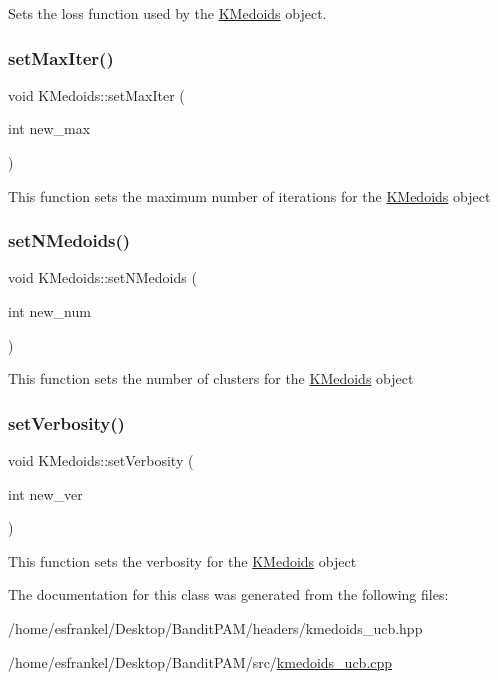 Sets the loss function used by the \hyperlink{classKMedoids}{K\+Medoids} object. \mbox{\label{classKMedoids_ae1a84d5509090d31cd1c04616fd615f3}} 
\subsubsection{\texorpdfstring{set\+Max\+Iter()}{setMaxIter()}}
{\footnotesize\ttfamily void K\+Medoids\+::set\+Max\+Iter (\begin{DoxyParamCaption}\item[{int}]{new\+\_\+max }\end{DoxyParamCaption})}

This function sets the maximum number of iterations for the \hyperlink{classKMedoids}{K\+Medoids} object \mbox{\label{classKMedoids_ad28860f50c0b5a4968f99d103b3de06f}} 
\subsubsection{\texorpdfstring{set\+N\+Medoids()}{setNMedoids()}}
{\footnotesize\ttfamily void K\+Medoids\+::set\+N\+Medoids (\begin{DoxyParamCaption}\item[{int}]{new\+\_\+num }\end{DoxyParamCaption})}

This function sets the number of clusters for the \hyperlink{classKMedoids}{K\+Medoids} object \mbox{\label{classKMedoids_a8d03726bbd66ffc6d2c202d2a3cf40d5}} 
\subsubsection{\texorpdfstring{set\+Verbosity()}{setVerbosity()}}
{\footnotesize\ttfamily void K\+Medoids\+::set\+Verbosity (\begin{DoxyParamCaption}\item[{int}]{new\+\_\+ver }\end{DoxyParamCaption})}

This function sets the verbosity for the \hyperlink{classKMedoids}{K\+Medoids} object 

The documentation for this class was generated from the following files\+:\begin{DoxyCompactItemize}
\item 
/home/esfrankel/\+Desktop/\+Bandit\+P\+A\+M/headers/kmedoids\+\_\+ucb.\+hpp\item 
/home/esfrankel/\+Desktop/\+Bandit\+P\+A\+M/src/\hyperlink{kmedoids__ucb_8cpp}{kmedoids\+\_\+ucb.\+cpp}\end{DoxyCompactItemize}
